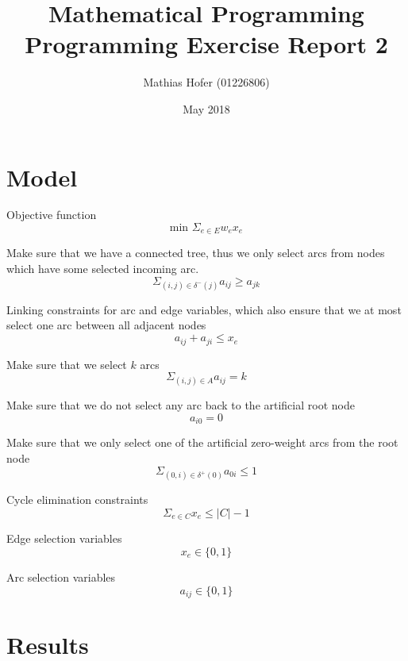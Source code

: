 \documentclass{article}
\title{Mathematical Programming\\Programming Exercise Report 2}
\author{Mathias Hofer (01226806)}
\date{May 2018}
\begin{document}
\maketitle

\section{Model}
Objective function
\[\text{min } \Sigma_{e \in E} w_e x_e\]

\noindent
Make sure that we have a connected tree, thus we only select arcs from nodes which have some selected incoming arc.
\[\Sigma_{(i,j) \in \delta^-(j)} a_{i j} \ge a_{j k} \tag*{$\forall j \in V$, $\forall (j,k) \in \delta^+(j)$}\]

\noindent
Linking constraints for arc and edge variables, which also ensure that we at most select one arc between all adjacent nodes
\[a_{i j} + a_{j i} \leq x_e \tag*{$\forall e=(i,j) \in E$}\]

\noindent
Make sure that we select $k$ arcs
\[\Sigma_{(i,j) \in A} a_{i j} = k\]

\noindent
Make sure that we do not select any arc back to the artificial root node
\[a_{i 0} = 0 \tag*{$\forall i \in V$}\]

\noindent
Make sure that we only select one of the artificial zero-weight arcs from the root node
\[\Sigma_{(0,i) \in \delta^+(0)} a_{0 i} \le 1\]

\noindent
Cycle elimination constraints
\[\Sigma_{e \in C} x_e \leq |C| - 1 \tag*{$\forall C \subseteq E$, $|C| \geq 2$, $C$ forms a cycle}\]

\noindent
Edge selection variables
\[x_e \in \{0, 1\} \tag*{$e \in E$}\]

\noindent
Arc selection variables
\[a_{i j} \in \{0, 1\} \tag*{$(i,j) \in A$}\]

\section{Results}
\end{document}
